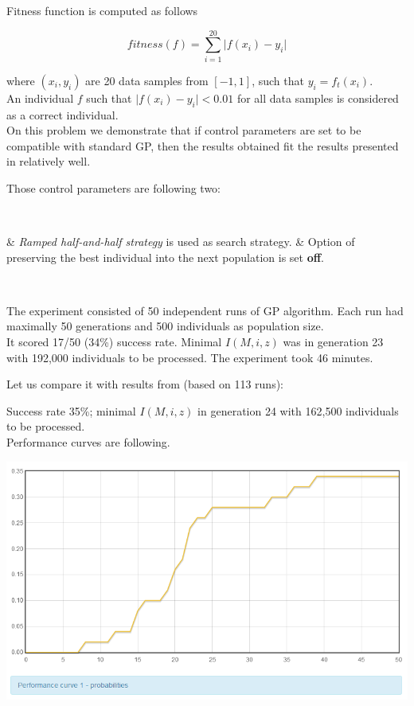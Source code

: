 \documentclass[12pt,a4paper]{report}
\newcommand{\Lets}{Let us\xspace}
\newenvironment{enum}
{\begin{easylist}[itemize]}
{\end{easylist}}
\begin{document}
Fitness function is computed as follows

$$ fitness(f) =  \sum\limits_{i=1}^{20}{ \vert f(x_i)-y_i }\vert   $$

where $(x_i,y_i)$ are 20 data samples from $[-1,1]$, such that $y_i = f_t(x_i)$.\\

An individual $f$ such that $\vert f(x_i)-y_i \vert < 0.01 $ for all data samples is 
considered as a correct individual.\\

On this problem we demonstrate that if control parameters are set to be
compatible with standard GP, then the results obtained fit the results
presented in \cite{koza92} relatively well. 

Those control parameters are following two:

~\begin{enum}
 & \textit{Ramped half-and-half strategy} is used as search strategy.
 & Option of preserving the best individual into the next population is set \textbf{off}.
\end{enum}~

The experiment consisted of 50 independent runs of GP algorithm.
Each run had maximally 50 generations and 500 individuals as population size.\\

It scored 17/50 (34\%) success rate. 
Minimal $I(M,i,z)$ was in generation 23 
with 192,000 individuals to be processed.
The experiment took 46 minutes.

\Lets compare it with results from \cite{koza92} (based on 113 runs):

Success rate 35\%; minimal $I(M,i,z)$ in generation 24 
with 162,500 individuals to be processed.\\

Performance curves are following.

\includegraphics[scale=0.65]{reports/SSR/1/probabs.png}
\end{document}
